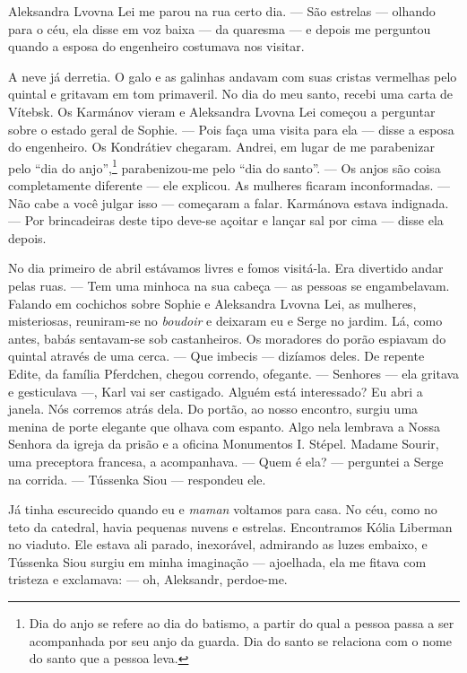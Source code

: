 Aleksandra Lvovna Lei me parou na rua certo dia. --- São estrelas ---
olhando para o céu, ela disse em voz baixa --- da quaresma --- e depois
me perguntou quando a esposa do engenheiro costumava nos visitar.

A neve já derretia. O galo e as galinhas andavam com suas cristas
vermelhas pelo quintal e gritavam em tom primaveril. No dia do meu
santo, recebi uma carta de Vítebsk. Os Karmánov vieram e Aleksandra
Lvovna Lei começou a perguntar sobre o estado geral de Sophie. --- Pois
faça uma visita para ela --- disse a esposa do engenheiro. Os Kondrátiev
chegaram. Andrei, em lugar de me parabenizar pelo ``dia do
anjo'',\footnote{Dia do anjo se refere ao dia do batismo, a partir do
  qual a pessoa passa a ser acompanhada por seu anjo da guarda. Dia do
  santo se relaciona com o nome do santo que a pessoa leva.}
parabenizou-me pelo ``dia do santo''. --- Os anjos são coisa
completamente diferente --- ele explicou. As mulheres ficaram
inconformadas. --- Não cabe a você julgar isso --- começaram a falar.
Karmánova estava indignada. --- Por brincadeiras deste tipo deve-se
açoitar e lançar sal por cima --- disse ela depois.

No dia primeiro de abril estávamos livres e fomos visitá-la. Era
divertido andar pelas ruas. --- Tem uma minhoca na sua cabeça --- as
pessoas se engambelavam. Falando em cochichos sobre Sophie e Aleksandra
Lvovna Lei, as mulheres, misteriosas, reuniram-se no \emph{boudoir} e
deixaram eu e Serge no jardim. Lá, como antes, babás sentavam-se sob
castanheiros. Os moradores do porão espiavam do quintal através de uma
cerca. --- Que imbecis --- dizíamos deles. De repente Edite, da família
Pferdchen, chegou correndo, ofegante. --- Senhores --- ela gritava e
gesticulava ---, Karl vai ser castigado. Alguém está interessado? Eu
abri a janela. Nós corremos atrás dela. Do portão, ao nosso encontro,
surgiu uma menina de porte elegante que olhava com espanto. Algo nela
lembrava a Nossa Senhora da igreja da prisão e a oficina Monumentos I.
Stépel. Madame Sourir, uma preceptora francesa, a acompanhava. --- Quem
é ela? --- perguntei a Serge na corrida. --- Tússenka Siou --- respondeu
ele.

Já tinha escurecido quando eu e \emph{maman} voltamos para casa. No céu,
como no teto da catedral, havia pequenas nuvens e estrelas. Encontramos
Kólia Liberman no viaduto. Ele estava ali parado, inexorável, admirando
as luzes embaixo, e Tússenka Siou surgiu em minha imaginação ---
ajoelhada, ela me fitava com tristeza e exclamava: --- oh, Aleksandr,
perdoe-me.

